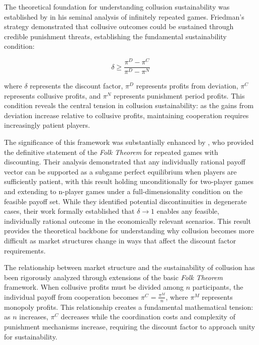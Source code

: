 The theoretical foundation for understanding collusion sustainability was established by \textcite{friedman_non-cooperative_1971} in his seminal analysis of infinitely repeated games. Friedman's  strategy demonstrated that collusive outcomes could be sustained through credible punishment threats, establishing the fundamental sustainability condition:

\begin{equation}
    \delta \geq \frac{\pi^{D} - \pi^{C}}{\pi^{D} - \pi^{N}}
\end{equation}

where $\delta$ represents the discount factor, $\pi^{D}$ represents profits from deviation, $\pi^{C}$ represents collusive profits, and $\pi^{N}$ represents punishment period profits. This condition reveals the central tension in collusion sustainability: as the gains from deviation increase relative to collusive profits, maintaining cooperation requires increasingly patient players.

The significance of this framework was substantially enhanced by \textcite{fudenberg_folk_1986}, who provided the definitive statement of the \emph{Folk Theorem} for repeated games with discounting. Their analysis demonstrated that any individually rational payoff vector can be supported as a subgame perfect equilibrium when players are sufficiently patient, with this result holding unconditionally for two-player games and extending to n-player games under a full-dimensionality condition on the feasible payoff set. While they identified potential discontinuities in degenerate cases, their work formally established that $\delta \rightarrow 1$ enables any feasible, individually rational outcome in the economically relevant scenarios. This result provides the theoretical backbone for understanding why collusion becomes more difficult as market structures change in ways that affect the discount factor requirements.

The relationship between market structure and the sustainability of collusion has been rigorously analyzed through extensions of the basic \emph{Folk Theorem} framework. When collusive profits must be divided among $n$ participants, the individual payoff from cooperation becomes $\pi^C = \frac{\pi^M}{n}$, where $\pi^M$ represents monopoly profits. This relationship creates a fundamental mathematical tension: as $n$ increases, $\pi^C$ decreases while the coordination costs and complexity of punishment mechanisms increase, requiring the discount factor to approach unity for sustainability.

